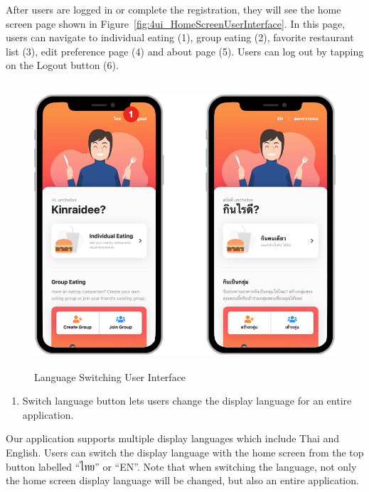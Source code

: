 \documentclass[12pt,oneside,openright,a4paper]{cpe-english-project}
\begin{document}
After users are logged in or complete the registration, they will see the home screen page shown in Figure~\ref{fig:4ui_HomeScreenUserInterface}. In this page, users can navigate to individual eating (1), group eating (2), favorite restaurant list (3), edit preference page (4) and about page (5). Users can log out by tapping on the Logout button (6).
\begin{figure}[H]\centering
\includegraphics[height=300pt]{./images/4ui_LanguageSwitchingUserInterface.png}
\caption{Language Switching User Interface}\label{fig:4ui_LanguageSwitchingUserInterface}
\end{figure}

\begin{enumerate}
\item Switch language button lets users change the display language for an entire application.
\end{enumerate}

Our application supports multiple display languages which include Thai and English. Users can switch the display language with the home screen from the top button labelled “ไทย” or “EN”. Note that when switching the language, not only the home screen display language will be changed, but also an entire application.

\newpage
\end{document}
